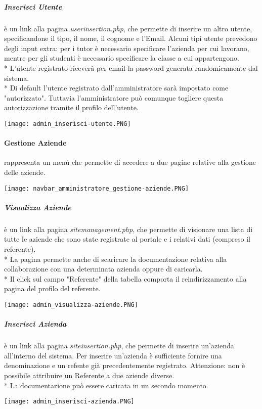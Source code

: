 \documentclass[12pt]{article}
\begin{document}
\subparagraph{Inserisci Utente} è un link alla pagina \textit{userinsertion.php}, che permette di inserire un altro utente, specificandone il tipo, il nome, il cognome e l'Email. Alcuni tipi utente prevedono degli input extra: per i tutor è necessario specificare l'azienda per cui lavorano, mentre per gli studenti è necessario specificare la classe a cui appartengono.\\*
L'utente registrato riceverà per email la password generata randomicamente dal sistema.\\*
Di default l'utente registrato dall'amministratore sarà impostato come "autorizzato". Tuttavia l'amministratore può comunque togliere questa autorizzazione tramite il profilo dell'utente.
\begin{center}
    \texttt{[image: admin\_inserisci-utente.PNG]}
\end{center}
\bigskip


\paragraph{Gestione Aziende} rappresenta un menù che permette di accedere a due pagine relative alla gestione delle aziende.
\begin{center}
    \texttt{[image: navbar\_amministratore\_gestione-aziende.PNG]}
\end{center}

\subparagraph{Visualizza Aziende} è un link alla pagina \textit{sitemanagement.php}, che permette di visionare una lista di tutte le aziende che sono state registrate al portale e i relativi dati (compreso il referente).\\*
La pagina permette anche di scaricare la documentazione relativa alla collaborazione con una determinata azienda oppure di caricarla.\\*
Il click sul campo "Referente" della tabella comporta il reindirizzamento alla pagina del profilo del referente.
\begin{center}
    \texttt{[image: admin\_visualizza-aziende.PNG]}
\end{center}


\subparagraph{Inserisci Azienda} è un link alla pagina \textit{siteinsertion.php}, che permette di inserire un'azienda all'interno del sistema. Per inserire un'azienda è sufficiente fornire una denominazione e un refente già precedentemente registrato. Attenzione: non è possibile attribuire un Referente a due aziende diverse.\\*
La documentazione può essere caricata in un secondo momento.
\begin{center}
    \texttt{[image: admin\_inserisci-azienda.PNG]}
\end{center}
\bigskip
\end{document}
